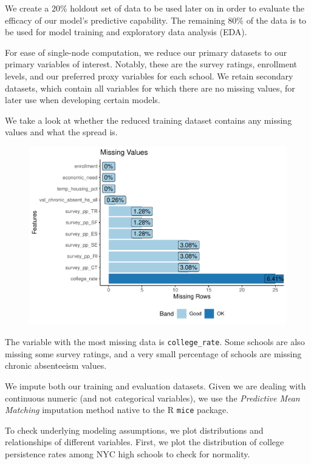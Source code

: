 \documentclass[
  man,floatsintext]{apa6}
\begin{document}
We create a 20\% holdout set of data to be used later on in order to evaluate the efficacy of our model's predictive capability. The remaining 80\% of the data is to be used for model training and exploratory data analysis (EDA).

For ease of single-node computation, we reduce our primary datasets to our primary variables of interest. Notably, these are the survey ratings, enrollment levels, and our preferred proxy variables for each school. We retain secondary datasets, which contain all variables for which there are no missing values, for later use when developing certain models.

We take a look at whether the reduced training dataset contains any missing values and what the spread is.

\begin{figure}[H]
\includegraphics[width=\textwidth]{final-project_files/figure-latex/data4-1} \caption{ }\label{fig:data4}
\end{figure}

The variable with the most missing data is \texttt{college\_rate}. Some schools are also missing some survey ratings, and a very small percentage of schools are missing chronic absenteeism values.

We impute both our training and evaluation datasets. Given we are dealing with continuous numeric (and not categorical variables), we use the \emph{Predictive Mean Matching} imputation method native to the R \texttt{mice} package.

To check underlying modeling assumptions, we plot distributions and relationships of different variables. First, we plot the distribution of college persistence rates among NYC high schools to check for normality.
\end{document}
